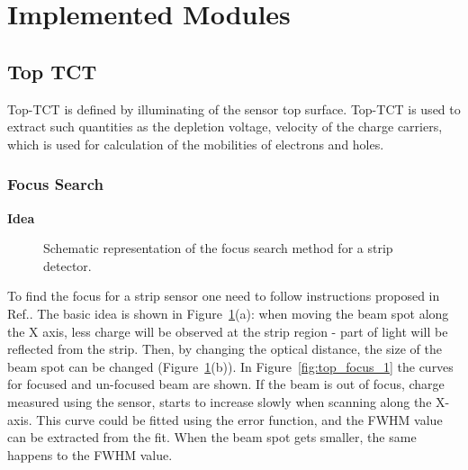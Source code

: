 \documentclass[12pt,oneside,notitlepage,abstracton,a4paper]{scrartcl}
\begin{document}
\section{Implemented Modules}\label{modules}
\subsection{Top TCT}\label{modules:top} 

\indent Top-TCT is defined by illuminating of the sensor top surface. Top-TCT is used to extract such quantities as the depletion voltage, velocity of the charge carriers, which is used for calculation of the mobilities of electrons and holes.

\subsubsection{Focus Search}\label{modules:top:focus}

\textbf{Idea}
\begin{figure}[h]
    \centering
    \qquad
    \caption{Schematic representation of the focus search method for a strip detector.\cite{bib:focus}}
    \label{fig:top_focus}
\end{figure} 

To find the focus for a strip sensor one need to follow instructions proposed in Ref.\cite{bib:focus}. The basic idea is shown in Figure~\ref{fig:top_focus}(a): when moving the beam spot along the X axis, less charge will be observed at the strip region - part of light will be reflected from the strip. Then, by changing the optical distance, the size of the beam spot can be changed (Figure~\ref{fig:top_focus}(b)). In Figure~\ref{fig:top_focus_1} the curves for focused and un-focused beam are shown. If the beam is out of focus, charge measured using the sensor, starts to increase slowly when scanning along the X-axis. This curve could be fitted using the error function, and the FWHM value can be extracted from the fit. When the beam spot gets smaller, the same happens to the FWHM value.  
\end{document}
